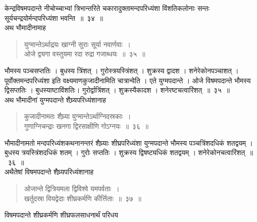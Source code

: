 \documentclass[11pt, openany]{book}
\begin{document}
\begin{sloppypar}
\noindent केन्द्रविषमपदान्ते नीचोच्चाभ्यां त्रिभान्तरिते चकारादुक्तामन्दपरिध्यंशा विंशतिकलोनाः सन्तः सूर्यचन्द्रयोर्मन्दपरिध्यंशा भवन्ति~॥~३४~॥\\
\noindent अथ भौमादीनामाह\textendash
\end{sloppypar}
\begin{quote}

{\ssi युग्मान्तेऽर्थाद्रयः खाग्नी सुराः सूर्या नवार्णवाः~।\\
ओजे द्व्यगा वस्तुयमा रदा रुद्रा गजाब्धयः~॥~३५~॥}
\end{quote}
\begin{sloppypar}
भौमस्य पञ्चसप्ततिः । बुधस्य त्रिंशत् । गुरोस्त्रयस्त्रिंशत् । शुक्रस्य द्वादश । शनेरेकोनपञ्चाशत् । पूर्वोक्तमन्दपरिध्यंशा इति वक्ष्यमाणकुजादीनामिति चात्रान्वेति । एते युग्मपदान्ते । ओजे विषमपदान्ते भौमस्य द्विसप्ततिः । बुधस्याष्टाविंशतिः। गुरोर्द्वात्रिंशत् । शुक्रस्यैकादश । शनेरष्टचत्वारिंशत्~॥~३५~॥\\
\noindent अथ भौमादीनां युग्मपदान्ते शैघ्र्यपरिध्यंशानाह\textendash
\end{sloppypar}
\begin{quote}

{\ssi कुजादीनामतः शैघ्र्या युग्मान्तेऽर्थाग्निदस्रकाः~।\\
गुणाग्निचन्द्राः खनगा द्विरसाक्षीणि गोऽग्नयः~॥~३६~॥}
\end{quote}
\begin{sloppypar}

भौमादीनामतो मन्दपरिध्यंशकथनानन्तरं शैघ्र्याः शीघ्रपरिध्यंशा युग्मपदान्ते भौमस्य पञ्चत्रिंशदधिकं शतद्वयम् । बुधस्य त्रयस्त्रिंशदधिकं शतम् । गुरोः सप्ततिः । शुक्रस्य द्विषष्ट्यधिकं शतद्वयम् । शनेरेकोनचत्वारिंशत्~॥~३६~॥\\
\noindent अथैतेषां विषमपदान्ते शैघ्र्यपरिध्यंशानाह\textendash
\end{sloppypar}
\begin{quote}

{\ssi ओजान्ते द्वित्रियमला द्विविश्वे यमपर्वताः~।\\
खर्तुदस्रा वियद्वेदाः शीघ्रकर्मणि कीर्त्तिताः~॥~३७~॥}
\end{quote}
{\setlength{\parindent}{5em}विषमपदान्ते शीघ्रकर्मणि शीघ्रफलसाधनार्थं परिधय}
\end{document}
